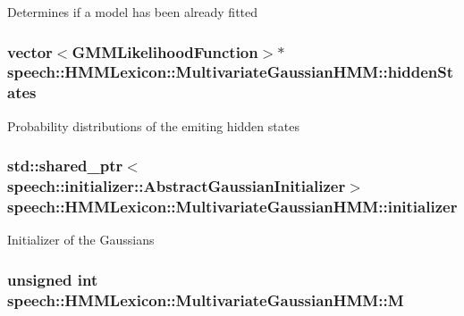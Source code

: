 Determines if a model has been already fitted \hypertarget{classspeech_1_1HMMLexicon_1_1MultivariateGaussianHMM_ad8e2f5c818a425e7885f0cfb473048c3}{
\subsubsection[{hidden\+States}]{\setlength{\rightskip}{0pt plus 5cm}vector$<${\bf G\+M\+M\+Likelihood\+Function}$>$$\ast$ speech\+::\+H\+M\+M\+Lexicon\+::\+Multivariate\+Gaussian\+H\+M\+M\+::hidden\+States\hspace{0.3cm}{\ttfamily [protected]}}}\label{classspeech_1_1HMMLexicon_1_1MultivariateGaussianHMM_ad8e2f5c818a425e7885f0cfb473048c3}
Probability distributions of the emiting hidden states \hypertarget{classspeech_1_1HMMLexicon_1_1MultivariateGaussianHMM_ac83431423d755d272ebb0c4a82c03940}{
\subsubsection[{initializer}]{\setlength{\rightskip}{0pt plus 5cm}std\+::shared\+\_\+ptr$<${\bf speech\+::initializer\+::\+Abstract\+Gaussian\+Initializer}$>$ speech\+::\+H\+M\+M\+Lexicon\+::\+Multivariate\+Gaussian\+H\+M\+M\+::initializer\hspace{0.3cm}{\ttfamily [protected]}}}\label{classspeech_1_1HMMLexicon_1_1MultivariateGaussianHMM_ac83431423d755d272ebb0c4a82c03940}
Initializer of the Gaussians \hypertarget{classspeech_1_1HMMLexicon_1_1MultivariateGaussianHMM_a6895e59700c70169286b362532cf3a37}{
\subsubsection[{M}]{\setlength{\rightskip}{0pt plus 5cm}unsigned int speech\+::\+H\+M\+M\+Lexicon\+::\+Multivariate\+Gaussian\+H\+M\+M\+::\+M\hspace{0.3cm}{\ttfamily [protected]}}}\label{classspeech_1_1HMMLexicon_1_1MultivariateGaussianHMM_a6895e59700c70169286b362532cf3a37}

